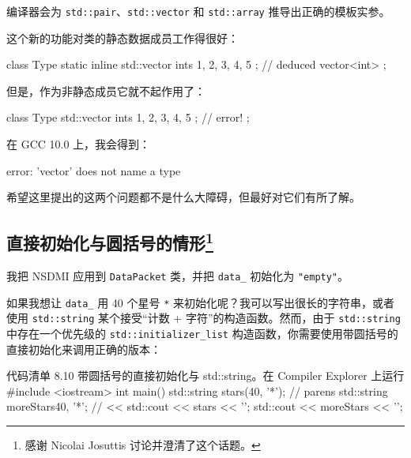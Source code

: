 编译器会为 \texttt{std::pair}、\texttt{std::vector} 和 \texttt{std::array} 推导出正确的模板实参。

这个新的功能对类的静态数据成员工作得很好：

\begin{codebox}[cpp]
class Type {
    static inline std::vector ints { 1, 2, 3, 4, 5 }; // deduced vector<int>
};
\end{codebox}

但是，作为非静态成员它就不起作用了：

\begin{codebox}[cpp]
class Type {
    std::vector ints { 1, 2, 3, 4, 5 }; // error!
};
\end{codebox}

在 GCC 10.0 上，我会得到：

\begin{codebox}[cpp]
error: 'vector' does not name a type
\end{codebox}

希望这里提出的这两个问题都不是什么大障碍，但最好对它们有所了解。


\subsection[直接初始化与圆括号的情形]{直接初始化与圆括号的情形\protect\footnote{感谢 Nicolai Josuttis 讨论并澄清了这个话题。}}

我把 NSDMI 应用到 \texttt{DataPacket} 类，并把 \texttt{data\_} 初始化为 \texttt{"empty"}。

\begin{codebox}[cpp]
class DataPacket {
    std::string data_ {"empty"};
    // .. the rest...
\end{codebox}

如果我想让 \texttt{data\_} 用 40 个星号 \texttt{*} 来初始化呢？我可以写出很长的字符串，或者使用 \texttt{std::string} 某个接受“计数 + 字符”的构造函数。然而，由于 \texttt{std::string} 中存在一个优先级的 \texttt{std::initializer\_list} 构造函数，你需要使用带圆括号的直接初始化来调用正确的版本：

\begin{codeboxt}[cpp]{代码清单 8.10 带圆括号的直接初始化与 std::string。在 Compiler Explorer 上运行}
#include <iostream>
int main() {
    std::string stars(40, '*');
    // parens
    std::string moreStars{40, '*'}; // <<
    std::cout << stars << '\n';
    std::cout << moreStars << '\n';
}
\end{codeboxt}


